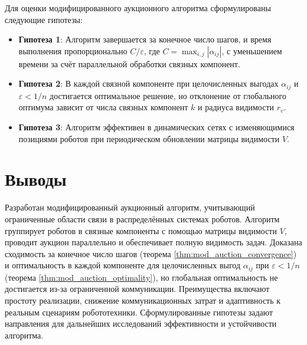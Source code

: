 Для оценки модифицированного аукционного алгоритма сформулированы следующие гипотезы:
\begin{itemize}
    \item \textbf{Гипотеза 1}: Алгоритм завершается за конечное число шагов, и время выполнения пропорционально \( C / \varepsilon \), где \( C = \max_{i,j} |\alpha_{ij}| \), с уменьшением времени за счёт параллельной обработки связных компонент.
    \item \textbf{Гипотеза 2}: В каждой связной компоненте при целочисленных выгодах \( \alpha_{ij} \) и \( \varepsilon < 1/n \) достигается оптимальное решение, но отклонение от глобального оптимума зависит от числа связных компонент \( k \) и радиуса видимости \( r_v \).
    \item \textbf{Гипотеза 3}: Алгоритм эффективен в динамических сетях с изменяющимися позициями роботов при периодическом обновлении матрицы видимости \( V \).
\end{itemize}

\section{Выводы}

Разработан модифицированный аукционный алгоритм, учитывающий ограниченные области связи в распределённых системах роботов. Алгоритм группирует роботов в связные компоненты с помощью матрицы видимости \( V \), проводит аукцион параллельно и обеспечивает полную видимость задач. Доказана сходимость за конечное число шагов (теорема \ref{thm:mod_auction_convergence}) и оптимальность в каждой компоненте для целочисленных выгод \( \alpha_{ij} \) при \( \varepsilon < 1/n \) (теорема \ref{thm:mod_auction_optimality}), но глобальная оптимальность не достигается из-за ограниченной коммуникации. Преимущества включают простоту реализации, снижение коммуникационных затрат и адаптивность к реальным сценариям робототехники. Сформулированные гипотезы задают направления для дальнейших исследований эффективности и устойчивости алгоритма.